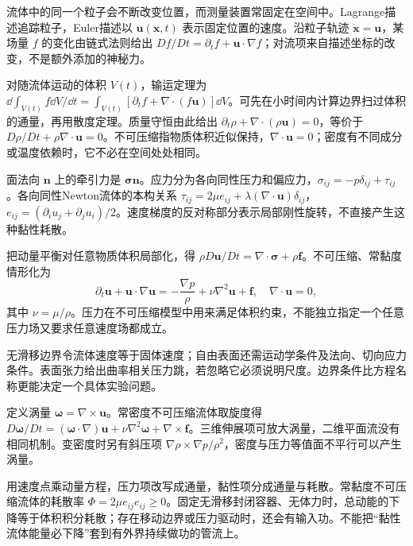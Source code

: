 流体中的同一个粒子会不断改变位置，而测量装置常固定在空间中。Lagrange描述追踪粒子，Euler描述以 $\mathbf u(\mathbf x,t)$ 表示固定位置的速度。沿粒子轨迹 $\dot{\mathbf x}=\mathbf u$，某场量 $f$ 的变化由链式法则给出 $Df/Dt=\partial_tf+\mathbf u\cdot\nabla f$；对流项来自描述坐标的改变，不是额外添加的神秘力。

对随流体运动的体积 $V(t)$，输运定理为 $\dd\int_{V(t)}f\dd V/\dd t=\int_{V(t)}[\partial_tf+\nabla\cdot(f\mathbf u)]\dd V$。可先在小时间内计算边界扫过体积的通量，再用散度定理。质量守恒由此给出 $\partial_t\rho+\nabla\cdot(\rho\mathbf u)=0$，等价于 $D\rho/Dt+\rho\nabla\cdot\mathbf u=0$。不可压缩指物质体积近似保持，$\nabla\cdot\mathbf u=0$；密度有不同成分或温度依赖时，它不必在空间处处相同。

面法向 $\mathbf n$ 上的牵引力是 $\boldsymbol\sigma\mathbf n$。应力分为各向同性压力和偏应力，$\sigma_{ij}=-p\delta_{ij}+\tau_{ij}$。各向同性Newton流体的本构关系 $\tau_{ij}=2\mu e_{ij}+\lambda(\nabla\cdot\mathbf u)\delta_{ij}$，$e_{ij}=(\partial_i u_j+\partial_j u_i)/2$。速度梯度的反对称部分表示局部刚性旋转，不直接产生这种黏性耗散。

把动量平衡对任意物质体积局部化，得 $\rho D\mathbf u/Dt=\nabla\cdot\boldsymbol\sigma+\rho\mathbf f$。不可压缩、常黏度情形化为
\begin{equation}\label{eq:ns}
\partial_t\mathbf u+\mathbf u\cdot\nabla\mathbf u=-\frac{\nabla p}\rho+\nu\nabla^2\mathbf u+\mathbf f,
\quad\nabla\cdot\mathbf u=0,
\end{equation}
其中 $\nu=\mu/\rho$。压力在不可压缩模型中用来满足体积约束，不能独立指定一个任意压力场又要求任意速度场都成立。

无滑移边界令流体速度等于固体速度；自由表面还需运动学条件及法向、切向应力条件。表面张力给出曲率相关压力跳，若忽略它必须说明尺度。边界条件比方程名称更能决定一个具体实验问题。

定义涡量 $\boldsymbol\omega=\nabla\times\mathbf u$。常密度不可压缩流体取旋度得 $D\boldsymbol\omega/Dt=(\boldsymbol\omega\cdot\nabla)\mathbf u+\nu\nabla^2\boldsymbol\omega+\nabla\times\mathbf f$。三维伸展项可放大涡量，二维平面流没有相同机制。变密度时另有斜压项 $\nabla\rho\times\nabla p/\rho^2$，密度与压力等值面不平行可以产生涡量。

用速度点乘动量方程，压力项改写成通量，黏性项分成通量与耗散。常黏度不可压缩流体的耗散率 $\Phi=2\mu e_{ij}e_{ij}\ge0$。固定无滑移封闭容器、无体力时，总动能的下降等于体积积分耗散；存在移动边界或压力驱动时，还会有输入功。不能把“黏性流体能量必下降”套到有外界持续做功的管流上。

